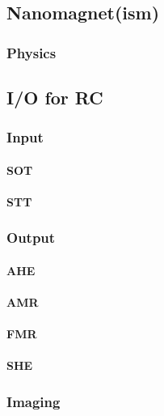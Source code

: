 \section{}\label{sec:ASI} %
\subsection{Nanomagnet(ism)}
\subsubsection{Physics} %
\subsection{I/O for RC}
\subsubsection{Input}
\paragraph{SOT}
\paragraph{STT} %
\subsubsection{Output}
\paragraph{AHE}
\paragraph{AMR} %
\paragraph{FMR} %
\paragraph{SHE} %
\subsubsection{Imaging} %
